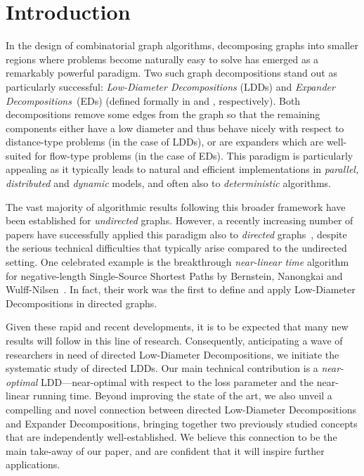 \section{Introduction} \label{sec:intro}
In the design of combinatorial graph algorithms, decomposing graphs into smaller regions where problems become naturally easy to solve has emerged as a remarkably powerful paradigm. Two such graph decompositions stand out as particularly successful: \emph{Low-Diameter Decompositions} (LDDs) and \emph{Expander Decompositions}~(EDs) (defined formally in  and , respectively). Both decompositions remove some edges from the graph so that the remaining components either have a low diameter and thus behave nicely with respect to distance-type problems (in the case of LDDs), or are expanders which are well-suited for flow-type problems (in the case of EDs). This paradigm is particularly appealing as it typically leads to natural and efficient implementations in \emph{parallel,} \emph{distributed} and \emph{dynamic} models, and often also to \emph{deterministic} algorithms.

The vast majority of algorithmic results following this broader framework have been established for \emph{undirected} graphs. However, a recently increasing number of papers have successfully applied this paradigm also to \emph{directed} graphs~\cite{BernsteinGS20,BernsteinNW22,HuaKGW23,ChuzhoyK24,BernsteinBST24}, despite the serious technical difficulties that typically arise compared to the undirected setting. One celebrated example is the breakthrough \emph{near-linear time} algorithm for negative-length Single-Source Shortest Paths by Bernstein, Nanongkai and Wulff-Nilsen~\cite{BernsteinNW22}. In fact, their work was the first to define and apply Low-Diameter Decompositions in directed graphs.

Given these rapid and recent developments, it is to be expected that many new results will follow in this line of research. Consequently, anticipating a wave of researchers in need of directed Low-Diameter Decompositions, we initiate the systematic study of directed LDDs. Our main technical contribution is a \emph{near-optimal} LDD---near-optimal with respect to the loss parameter and the near-linear running time. Beyond improving the state of the art, we also unveil a compelling and novel connection between directed Low-Diameter Decompositions and Expander Decompositions, bringing together two previously studied concepts that are independently well-established. We believe this connection to be the main take-away of our paper, and are confident that it will inspire further applications. 

